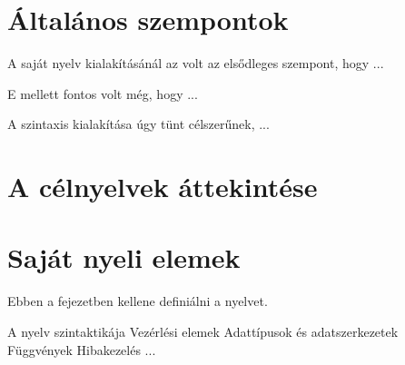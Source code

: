 
\section{Általános szempontok}

A saját nyelv kialakításánál az volt az elsődleges szempont, hogy ...

E mellett fontos volt még, hogy ...

A szintaxis kialakítása úgy tünt célszerűnek, ...







\section{A célnyelvek áttekintése}


\section{Saját nyeli elemek}

Ebben a fejezetben kellene definiálni a nyelvet.

A nyelv szintaktikája
Vezérlési elemek
Adattípusok és adatszerkezetek
Függvények
Hibakezelés
...



